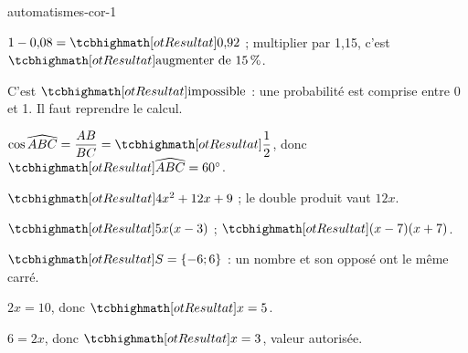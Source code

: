 \begin{blocEdition}{automatismes-cor-1}
\begin{deuxcolonnes}
\begin{questions}
\item \begin{minipage}[t]{\linewidth}\raggedright\leavevmode {}\enspace $1-0{,}08=\res{0{,}92}$ ; multiplier par 1,15, c’est $\res{\text{augmenter de }15\,\%}$.\end{minipage}
\item \begin{minipage}[t]{\linewidth}\raggedright\leavevmode {}\enspace C’est $\res{\text{impossible}}$ : une probabilité est comprise entre 0 et 1. Il faut reprendre le calcul.\end{minipage}
\item \begin{minipage}[t]{\linewidth}\raggedright\leavevmode {}\enspace $\cos\widehat{ABC}=\dfrac{AB}{BC}=\res{\dfrac12}$, donc $\res{\widehat{ABC}=60^\circ}$.\end{minipage}
\end{questions}\end{deuxcolonnes}
\begin{deuxcolonnes}\begin{questions}
\item \begin{minipage}[t]{\linewidth}\raggedright\leavevmode {}\enspace $\res{4x^2+12x+9}$ ; le double produit vaut $12x$.\end{minipage}
\item \begin{minipage}[t]{\linewidth}\raggedright\leavevmode {}\enspace $\res{5x(x-3)}$ ; $\res{(x-7)(x+7)}$.\end{minipage}
\item \begin{minipage}[t]{\linewidth}\raggedright\leavevmode {}\enspace $\res{S=\{-6;6\}}$ : un nombre et son opposé ont le même carré.\end{minipage}
\item \begin{minipage}[t]{\linewidth}\raggedright\leavevmode {}\enspace $2x=10$, donc $\res{x=5}$.\end{minipage}
\item \begin{minipage}[t]{\linewidth}\raggedright\leavevmode {}\enspace $6=2x$, donc $\res{x=3}$, valeur autorisée.\end{minipage}

\end{questions}
\end{deuxcolonnes}
\end{blocEdition}
